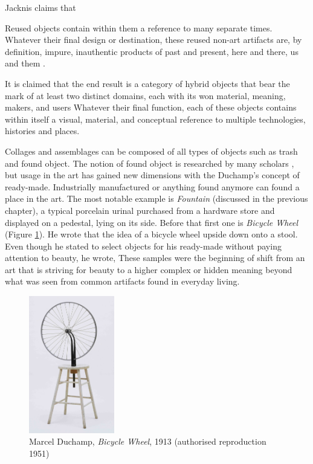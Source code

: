 Jacknis \citep[as cited in][]{cerny1996recycled} claims that 

Reused objects contain within them a reference to many separate times. Whatever their final design or destination, these reused non-art artifacts are, by definition, impure, inauthentic products of past and present, here and there, us and them \citep{cerny1996recycled}.

It is claimed that the end result is a category of hybrid objects that bear the mark of at least two distinct domains, each with its won material, meaning, makers, and users \citep{cerny1996recycled} Whatever their final function, each of these objects contains within itself a visual, material, and conceptual reference to multiple technologies, histories and places.

Collages and assemblages can be composed of all types of objects such as trash and found object. The notion of found object is researched by many scholars \cite{camic2010trashed, gascoyne1936short}, but usage in the art has gained new dimensions with the Duchamp’s concept of ready-made. Industrially manufactured or anything found  anymore can found a place in the art. The most notable example is \textit{Fountain} (discussed in the previous chapter), a typical porcelain urinal purchased from a hardware store and displayed on a pedestal, lying on its side. Before that first one is \textit{Bicycle Wheel} (Figure \ref{fig:Duchamp_BicycleWheel}). He wrote that the idea of a bicycle wheel upside down onto a stool. Even though he stated to select objects for his ready-made without paying attention to beauty, he wrote,  These samples were the beginning of shift from an art that is striving for beauty to a higher complex or hidden meaning beyond what was seen from common artifacts found in everyday living.

\begin{figure}[h!]
  \centering
  \includegraphics[height=6cm]{graphics/duchamp-bicycle-wheel-1913.jpg}
  \caption{Marcel Duchamp, \textit{Bicycle Wheel}, 1913 (authorised reproduction 1951)}
  \label{fig:Duchamp_BicycleWheel}
\end{figure}


